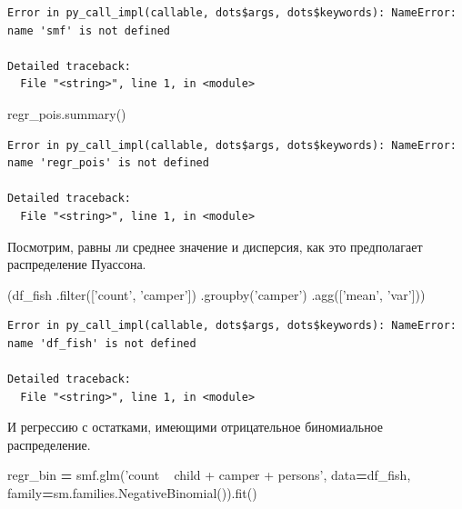 \documentclass[]{book}
\newenvironment{Shaded}{\begin{snugshade}}{\end{snugshade}}
\newcommand{\BuiltInTok}[1]{#1}
\newcommand{\NormalTok}[1]{#1}
\newcommand{\OperatorTok}[1]{\textcolor[rgb]{0.81,0.36,0.00}{\textbf{#1}}}
\newcommand{\StringTok}[1]{\textcolor[rgb]{0.31,0.60,0.02}{#1}}
\begin{document}
\begin{verbatim}
Error in py_call_impl(callable, dots$args, dots$keywords): NameError: name 'smf' is not defined

Detailed traceback: 
  File "<string>", line 1, in <module>
\end{verbatim}

\begin{Shaded}
\begin{Highlighting}[]
\NormalTok{regr_pois.summary()}
\end{Highlighting}
\end{Shaded}

\begin{verbatim}
Error in py_call_impl(callable, dots$args, dots$keywords): NameError: name 'regr_pois' is not defined

Detailed traceback: 
  File "<string>", line 1, in <module>
\end{verbatim}

Посмотрим, равны ли среднее значение и дисперсия, как это предполагает распределение Пуассона.

\begin{Shaded}
\begin{Highlighting}[]
\NormalTok{(df_fish}
\NormalTok{ .}\BuiltInTok{filter}\NormalTok{([}\StringTok{'count'}\NormalTok{, }\StringTok{'camper'}\NormalTok{])}
\NormalTok{ .groupby(}\StringTok{'camper'}\NormalTok{)}
\NormalTok{ .agg([}\StringTok{'mean'}\NormalTok{, }\StringTok{'var'}\NormalTok{]))}
\end{Highlighting}
\end{Shaded}

\begin{verbatim}
Error in py_call_impl(callable, dots$args, dots$keywords): NameError: name 'df_fish' is not defined

Detailed traceback: 
  File "<string>", line 1, in <module>
\end{verbatim}

И регрессию с остатками, имеющими отрицательное биномиальное распределение.

\begin{Shaded}
\begin{Highlighting}[]
\NormalTok{regr_bin }\OperatorTok{=}\NormalTok{ smf.glm(}\StringTok{'count ~ child + camper +  persons'}\NormalTok{, data}\OperatorTok{=}\NormalTok{df_fish,}
\NormalTok{              family}\OperatorTok{=}\NormalTok{sm.families.NegativeBinomial()).fit()}
\end{Highlighting}
\end{Shaded}
\end{document}
